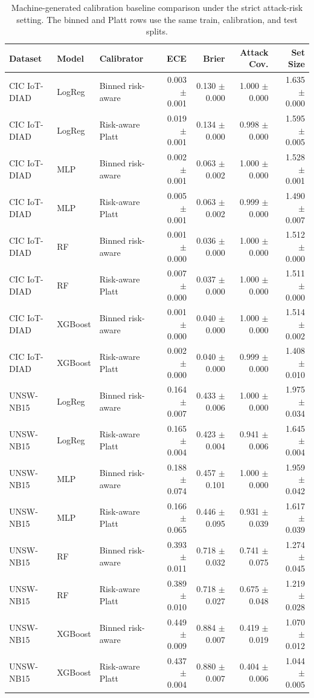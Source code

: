 \begin{table}[t]
\centering
\scriptsize
\setlength{\tabcolsep}{3pt}
\begin{tabular}{@{}lllrrrr@{}}
\toprule
Dataset & Model & Calibrator & ECE & Brier & Attack Cov. & Set Size \\
\midrule
CIC IoT-DIAD & LogReg & Binned risk-aware & 0.003 $\pm$ 0.001 & 0.130 $\pm$ 0.000 & 1.000 $\pm$ 0.000 & 1.635 $\pm$ 0.000 \\
CIC IoT-DIAD & LogReg & Risk-aware Platt & 0.019 $\pm$ 0.001 & 0.134 $\pm$ 0.000 & 0.998 $\pm$ 0.000 & 1.595 $\pm$ 0.005 \\
CIC IoT-DIAD & MLP & Binned risk-aware & 0.002 $\pm$ 0.001 & 0.063 $\pm$ 0.002 & 1.000 $\pm$ 0.000 & 1.528 $\pm$ 0.001 \\
CIC IoT-DIAD & MLP & Risk-aware Platt & 0.005 $\pm$ 0.001 & 0.063 $\pm$ 0.002 & 0.999 $\pm$ 0.000 & 1.490 $\pm$ 0.007 \\
CIC IoT-DIAD & RF & Binned risk-aware & 0.001 $\pm$ 0.000 & 0.036 $\pm$ 0.000 & 1.000 $\pm$ 0.000 & 1.512 $\pm$ 0.000 \\
CIC IoT-DIAD & RF & Risk-aware Platt & 0.007 $\pm$ 0.000 & 0.037 $\pm$ 0.000 & 1.000 $\pm$ 0.000 & 1.511 $\pm$ 0.000 \\
CIC IoT-DIAD & XGBoost & Binned risk-aware & 0.001 $\pm$ 0.000 & 0.040 $\pm$ 0.000 & 1.000 $\pm$ 0.000 & 1.514 $\pm$ 0.002 \\
CIC IoT-DIAD & XGBoost & Risk-aware Platt & 0.002 $\pm$ 0.000 & 0.040 $\pm$ 0.000 & 0.999 $\pm$ 0.000 & 1.408 $\pm$ 0.010 \\
UNSW-NB15 & LogReg & Binned risk-aware & 0.164 $\pm$ 0.007 & 0.433 $\pm$ 0.006 & 1.000 $\pm$ 0.000 & 1.975 $\pm$ 0.034 \\
UNSW-NB15 & LogReg & Risk-aware Platt & 0.165 $\pm$ 0.004 & 0.423 $\pm$ 0.004 & 0.941 $\pm$ 0.006 & 1.645 $\pm$ 0.004 \\
UNSW-NB15 & MLP & Binned risk-aware & 0.188 $\pm$ 0.074 & 0.457 $\pm$ 0.101 & 1.000 $\pm$ 0.000 & 1.959 $\pm$ 0.042 \\
UNSW-NB15 & MLP & Risk-aware Platt & 0.166 $\pm$ 0.065 & 0.446 $\pm$ 0.095 & 0.931 $\pm$ 0.039 & 1.617 $\pm$ 0.039 \\
UNSW-NB15 & RF & Binned risk-aware & 0.393 $\pm$ 0.011 & 0.718 $\pm$ 0.032 & 0.741 $\pm$ 0.075 & 1.274 $\pm$ 0.045 \\
UNSW-NB15 & RF & Risk-aware Platt & 0.389 $\pm$ 0.010 & 0.718 $\pm$ 0.027 & 0.675 $\pm$ 0.048 & 1.219 $\pm$ 0.028 \\
UNSW-NB15 & XGBoost & Binned risk-aware & 0.449 $\pm$ 0.009 & 0.884 $\pm$ 0.007 & 0.419 $\pm$ 0.019 & 1.070 $\pm$ 0.012 \\
UNSW-NB15 & XGBoost & Risk-aware Platt & 0.437 $\pm$ 0.004 & 0.880 $\pm$ 0.007 & 0.404 $\pm$ 0.006 & 1.044 $\pm$ 0.005 \\
\bottomrule
\end{tabular}
\caption{Machine-generated calibration baseline comparison under the strict attack-risk setting. The binned and Platt rows use the same train, calibration, and test splits.}
\label{tab:calibration-baseline}
\end{table}
